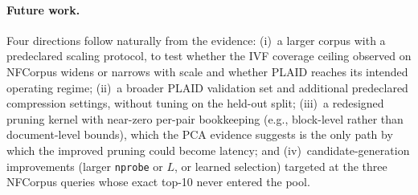 \paragraph{Future work.} Four directions follow naturally from the evidence:
(i)~a larger corpus with a predeclared scaling protocol,
to test whether the IVF coverage ceiling observed on NFCorpus widens or
narrows with scale and whether PLAID reaches its intended operating regime;
(ii)~a broader PLAID validation set and additional predeclared compression
settings, without tuning on the held-out split; (iii)~a redesigned pruning
kernel with near-zero per-pair
bookkeeping (e.g., block-level rather than document-level bounds), which the
PCA evidence suggests is the only path by which the improved pruning could
become latency; and (iv)~candidate-generation improvements
(larger \texttt{nprobe} or $L$, or learned selection) targeted at the three
NFCorpus queries whose exact top-10 never entered the pool.
